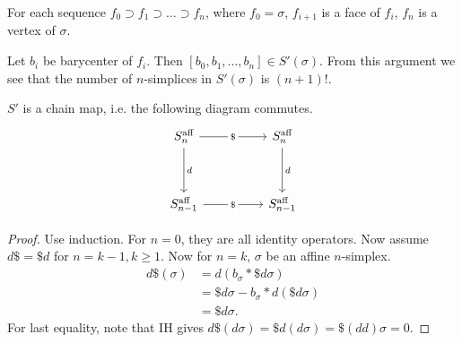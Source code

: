 \begin{remark}
	For each sequence $f_0 \supset f_1\supset\ldots\supset f_n$, where $f_0 = \sigma$, $f_{i + 1}$ is a face of $f_i$, $f_n$ is a vertex of $\sigma$. 

	Let $b_i$ be barycenter of $f_i$. Then $[b_0, b_1, \ldots, b_n] \in  S'(\sigma)$. From this argument we see that the number of $n$-simplices in $S'(\sigma)$ is $(n + 1)!$.
\end{remark}


\begin{lemma}
	\label{lem:SubdivisionChainMap}
	$S'$ is a chain map, i.e. the following diagram commutes.
\[\begin{tikzcd}
	{S^{\text{aff}}_{n } } && {S^{\text{aff}}_{n } } \\
	\\
	{S^{\text{aff}}_{n - 1} } && {S^{\text{aff}}_{n - 1} }
	\arrow["d", from=1-1, to=3-1]
	\arrow["d", from=1-3, to=3-3]
	\arrow["{\$}"{description}, from=1-1, to=1-3]
	\arrow["{\$}"{description}, from=3-1, to=3-3]
\end{tikzcd}\]
\end{lemma}
\begin{proof}
	Use induction. For $n = 0$, they are all identity operators. Now assume $d \$ = \$ d$ for $n = k - 1, k \ge 1$. Now for $n = k$, $\sigma$ be an affine $n$-simplex.
	\begin{align*}
		d \$ (\sigma) &= d(b_\sigma * \$ d \sigma) \\
		&= \$ d \sigma - b_\sigma * d(\$ d \sigma) \\
		&= \$ d \sigma
	.\end{align*}
	For last equality, note that IH gives $d \$ (d \sigma) = \$ d (d \sigma) = \$ (d d) \sigma = 0$.

\end{proof}


